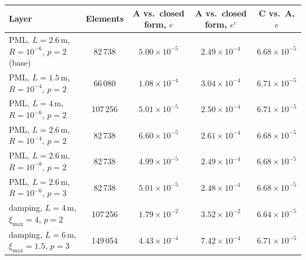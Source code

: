 \begin{tabular}{lcccc}
\toprule
Layer & Elements & A vs.\ closed form, $e$ & A vs.\ closed form, $e^{c}$ & C vs.\ A, $e$ \\
\midrule
PML, $L=2.6$\,m, $R=10^{-6}$, $p=2$ (base) & 82\,738 & $5.00\times 10^{-5}$ & $2.49\times 10^{-4}$ & $6.68\times 10^{-5}$ \\
PML, $L=1.5$\,m, $R=10^{-4}$, $p=2$ & 66\,080 & $1.08\times 10^{-4}$ & $3.04\times 10^{-4}$ & $6.71\times 10^{-5}$ \\
PML, $L=4$\,m, $R=10^{-6}$, $p=2$ & 107\,256 & $5.01\times 10^{-5}$ & $2.50\times 10^{-4}$ & $6.71\times 10^{-5}$ \\
PML, $L=2.6$\,m, $R=10^{-4}$, $p=2$ & 82\,738 & $6.60\times 10^{-5}$ & $2.61\times 10^{-4}$ & $6.68\times 10^{-5}$ \\
PML, $L=2.6$\,m, $R=10^{-8}$, $p=2$ & 82\,738 & $4.99\times 10^{-5}$ & $2.49\times 10^{-4}$ & $6.68\times 10^{-5}$ \\
PML, $L=2.6$\,m, $R=10^{-6}$, $p=3$ & 82\,738 & $5.01\times 10^{-5}$ & $2.48\times 10^{-4}$ & $6.68\times 10^{-5}$ \\
damping, $L=4$\,m, $\xi_{\max}=4$, $p=2$ & 107\,256 & $1.79\times 10^{-2}$ & $3.52\times 10^{-2}$ & $6.64\times 10^{-5}$ \\
damping, $L=6$\,m, $\xi_{\max}=1.5$, $p=3$ & 149\,054 & $4.43\times 10^{-4}$ & $7.42\times 10^{-4}$ & $6.71\times 10^{-5}$ \\
\bottomrule
\end{tabular}
